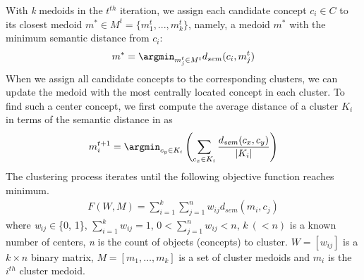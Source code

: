 With \emph{k} medoids in the $t^{th}$ iteration, we assign each
candidate concept $c_{i} \in C$ to its closest medoid $m^{*}\in M^{t}
= \{m_{1}^{t}, ..., m_{k}^{t}\}$, namely, a medoid $m^{*}$ with the
minimum semantic distance from $c_{i}$:
\begin{equation}
\label{eq:newCentroid}
m^* = \argmin_{m_{j}^{t}\in M^{t}}d_{sem}(c_{i}, m_{j}^{t})
\end{equation}
When we assign all candidate concepts to the corresponding clusters,
we can update the medoid with the most centrally located concept in
each cluster.  To find such a center concept, we first compute the
average distance of a cluster $K_{i}$ in terms of the semantic
distance in  as
\begin{equation}
\label{eq:update}
m_i^{t+1} = \argmin_{c_{y}\in K_{i}}\left(\sum_{c_x\in K_{i}}\frac{d_{sem}(c_{x},c_y)}{|K_{i}|}\right)
\end{equation}
The clustering process iterates until the following objective function reaches
minimum.
\begin{equation}
\label{eq:objectiveFun}
\begin{aligned}
F(W,M)=\sum^{k}_{i=1}\sum^{n}_{j=1}w_{ij}d_{sem}(m_{i},c_{j})
\end{aligned}
\end{equation}
where \textit{w}$_{ij}\in$\{0, 1\},
$\sum^{k}_{i=1}w_{ij}=1$, 0$<\sum^{n}_{j=1}w_{ij}<n$,
$k~ (<n)$ is a known number of centers, \emph{n} is the count of objects (concepts) to cluster.
$W = [w_{ij}]$ is a
$k \times n$ binary matrix, $M=[m_{1}, \ldots, m_{k}]$ is a set of cluster medoids
and $m_i$ is the $i^{th}$ cluster medoid.

